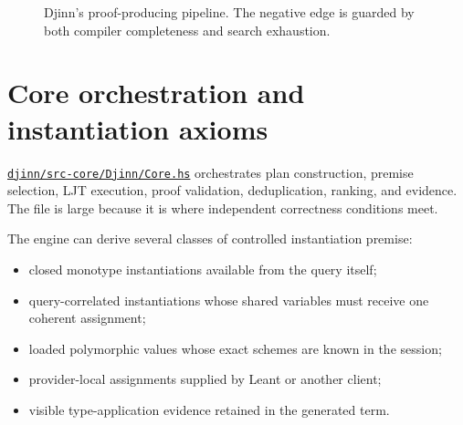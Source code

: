 \documentclass[10pt,letterpaper,oneside]{report}
\def\DjexBase{https://github.com/VladimirReshetnikov/Djex/blob/e454757d53ec057238c22fc6cd0d935b7d96b3dc/}
\newcommand{\dpath}[1]{\href{\DjexBase#1}{\nolinkurl{#1}}}
\newcommand{\Djinn}{Djinn}
\begin{document}
\begin{figure}[htbp]
\centering
{}
\caption{Djinn's proof-producing pipeline. The negative edge is guarded by both compiler completeness and search exhaustion.}
\label{fig:djinn-pipeline}
\end{figure}

\section{Core orchestration and instantiation axioms}

\dpath{djinn/src-core/Djinn/Core.hs} orchestrates plan construction, premise selection, LJT execution, proof validation, deduplication, ranking, and evidence. The file is large because it is where independent correctness conditions meet.

The engine can derive several classes of controlled instantiation premise:

\begin{itemize}
  \item closed monotype instantiations available from the query itself;
  \item query-correlated instantiations whose shared variables must receive one coherent assignment;
  \item loaded polymorphic values whose exact schemes are known in the session;
  \item provider-local assignments supplied by Leant or another client;
  \item visible type-application evidence retained in the generated term.
\end{itemize}
\end{document}
